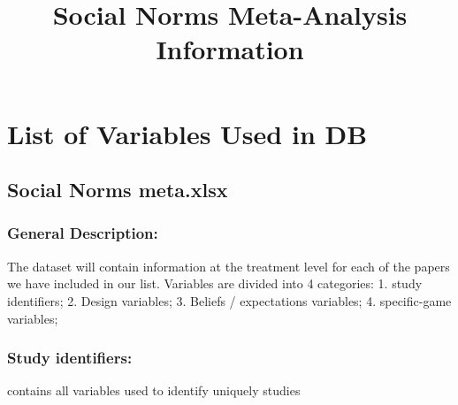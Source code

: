 \documentclass[
]{article}
\title{Social Norms Meta-Analysis Information}
\author{}
\date{\vspace{-2.5em}}
\begin{document}
\maketitle

{
\setcounter{tocdepth}{2}
\tableofcontents
}
\hypertarget{list-of-variables-used-in-db}{%
\section{List of Variables Used in
DB}\label{list-of-variables-used-in-db}}

\hypertarget{social-norms-meta.xlsx}{%
\subsection{Social Norms meta.xlsx}\label{social-norms-meta.xlsx}}

\hypertarget{general-description}{%
\subsubsection{General Description:}\label{general-description}}

The dataset will contain information at the treatment level for each of
the papers we have included in our list. Variables are divided into 4
categories: 1. study identifiers; 2. Design variables; 3. Beliefs /
expectations variables; 4. specific-game variables;

\hypertarget{Study_identifiers}{%
\subsubsection{Study identifiers:}\label{Study_identifiers}}

contains all variables used to identify uniquely studies
\end{document}
